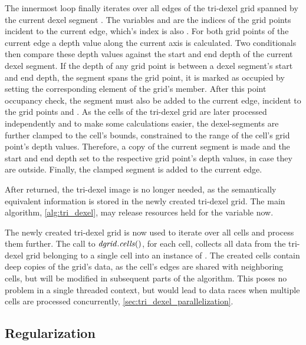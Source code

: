 The innermost loop finally iterates over all edges of the tri-dexel grid spanned by the current dexel segment .
The variables  and  are the indices of the grid points incident to the current edge, which's index is also .
For both grid points of the current edge a depth value along the current axis is calculated.
Two conditionals then compare these depth values against the start and end depth of the current dexel segment.
If the depth of any grid point is between a dexel segment's start and end depth, \ie the segment spans the grid point, it is marked as occupied by setting the corresponding element of the grid's  member.
After this point occupancy check, the segment must also be added to the current edge, incident to the grid points  and .
As the cells of the tri-dexel grid are later processed independently and to make some calculations easier, the dexel-segments are further clamped to the cell's bounds, \ie constrained to the range of the cell's grid point's depth values.
Therefore, a copy of the current segment is made and the start and end depth set to the respective grid point's depth values, in case they are outside.
Finally, the clamped segment is added to the current edge.

After  returned, the tri-dexel image is no longer needed, as the semantically equivalent information is stored in the newly created tri-dexel grid.
The main algorithm, \cref{alg:tri_dexel}, may release resources held for the  variable now.

The newly created tri-dexel grid  is now used to iterate over all cells and process them further.
The call to $\mathit{dgrid}.\mathit{cells}()$, for each cell, collects all data from the tri-dexel grid belonging to a single cell into an instance of .
The created cells contain deep copies of the grid's data, as the cell's edges are shared with neighboring cells, but will be modified in subsequent parts of the algorithm.
This poses no problem in a single threaded context, but would lead to data races when multiple cells are processed concurrently, \cf \cref{sec:tri_dexel_parallelization}.


\subsection{Regularization}
\label{sec:tri_dexel_regularization}

